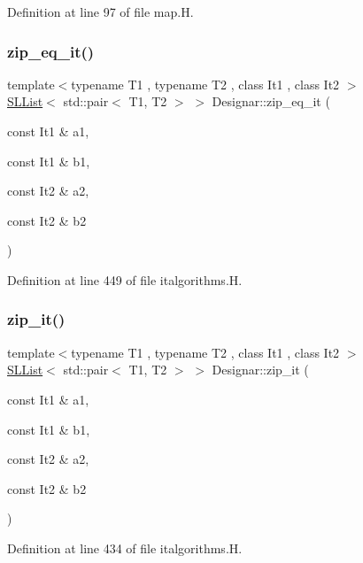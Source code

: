 Definition at line 97 of file map.\+H.

\mbox{\label{namespace_designar_a03bdb23b13b2aed29e869046d99e5bc6}} 
\subsubsection{\texorpdfstring{zip\+\_\+eq\+\_\+it()}{zip\_eq\_it()}}
{\footnotesize\ttfamily template$<$typename T1 , typename T2 , class It1 , class It2 $>$ \\
\hyperlink{class_designar_1_1_s_l_list}{S\+L\+List}$<$ std\+::pair$<$ T1, T2 $>$ $>$ Designar\+::zip\+\_\+eq\+\_\+it (\begin{DoxyParamCaption}\item[{const It1 \&}]{a1,  }\item[{const It1 \&}]{b1,  }\item[{const It2 \&}]{a2,  }\item[{const It2 \&}]{b2 }\end{DoxyParamCaption})}



Definition at line 449 of file italgorithms.\+H.

\mbox{\label{namespace_designar_a16eafe2daeba2559854cb96696a48f59}} 
\subsubsection{\texorpdfstring{zip\+\_\+it()}{zip\_it()}}
{\footnotesize\ttfamily template$<$typename T1 , typename T2 , class It1 , class It2 $>$ \\
\hyperlink{class_designar_1_1_s_l_list}{S\+L\+List}$<$ std\+::pair$<$ T1, T2 $>$ $>$ Designar\+::zip\+\_\+it (\begin{DoxyParamCaption}\item[{const It1 \&}]{a1,  }\item[{const It1 \&}]{b1,  }\item[{const It2 \&}]{a2,  }\item[{const It2 \&}]{b2 }\end{DoxyParamCaption})}



Definition at line 434 of file italgorithms.\+H.

